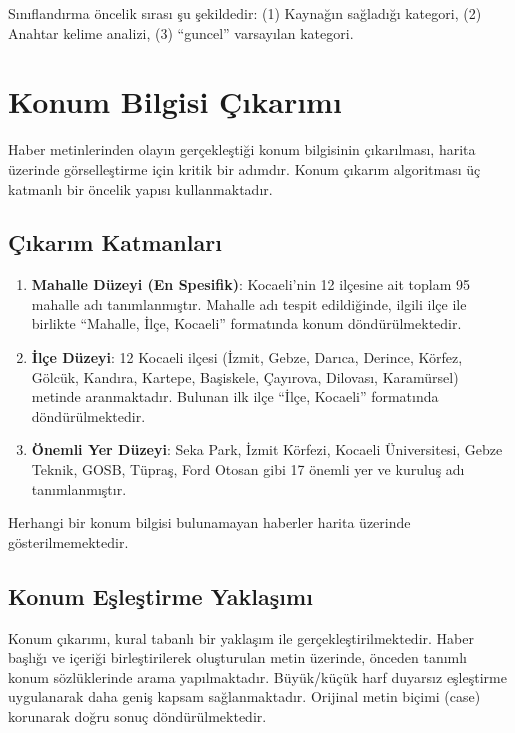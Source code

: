 \documentclass[conference]{IEEEtran}
\begin{document}
Sınıflandırma öncelik sırası şu şekildedir: (1) Kaynağın sağladığı kategori, (2) Anahtar kelime analizi, (3) ``guncel'' varsayılan kategori.

\section{Konum Bilgisi Çıkarımı}
\label{sec:location}

Haber metinlerinden olayın gerçekleştiği konum bilgisinin çıkarılması, harita üzerinde görselleştirme için kritik bir adımdır. Konum çıkarım algoritması üç katmanlı bir öncelik yapısı kullanmaktadır.

\subsection{Çıkarım Katmanları}

\begin{enumerate}
    \item \textbf{Mahalle Düzeyi (En Spesifik)}: Kocaeli'nin 12 ilçesine ait toplam 95 mahalle adı tanımlanmıştır. Mahalle adı tespit edildiğinde, ilgili ilçe ile birlikte ``Mahalle, İlçe, Kocaeli'' formatında konum döndürülmektedir.

    \item \textbf{İlçe Düzeyi}: 12 Kocaeli ilçesi (İzmit, Gebze, Darıca, Derince, Körfez, Gölcük, Kandıra, Kartepe, Başiskele, Çayırova, Dilovası, Karamürsel) metinde aranmaktadır. Bulunan ilk ilçe ``İlçe, Kocaeli'' formatında döndürülmektedir.

    \item \textbf{Önemli Yer Düzeyi}: Seka Park, İzmit Körfezi, Kocaeli Üniversitesi, Gebze Teknik, GOSB, Tüpraş, Ford Otosan gibi 17 önemli yer ve kuruluş adı tanımlanmıştır.
\end{enumerate}

Herhangi bir konum bilgisi bulunamayan haberler harita üzerinde gösterilmemektedir.

\subsection{Konum Eşleştirme Yaklaşımı}

Konum çıkarımı, kural tabanlı bir yaklaşım ile gerçekleştirilmektedir. Haber başlığı ve içeriği birleştirilerek oluşturulan metin üzerinde, önceden tanımlı konum sözlüklerinde arama yapılmaktadır. Büyük/küçük harf duyarsız eşleştirme uygulanarak daha geniş kapsam sağlanmaktadır. Orijinal metin biçimi (case) korunarak doğru sonuç döndürülmektedir.
\end{document}
